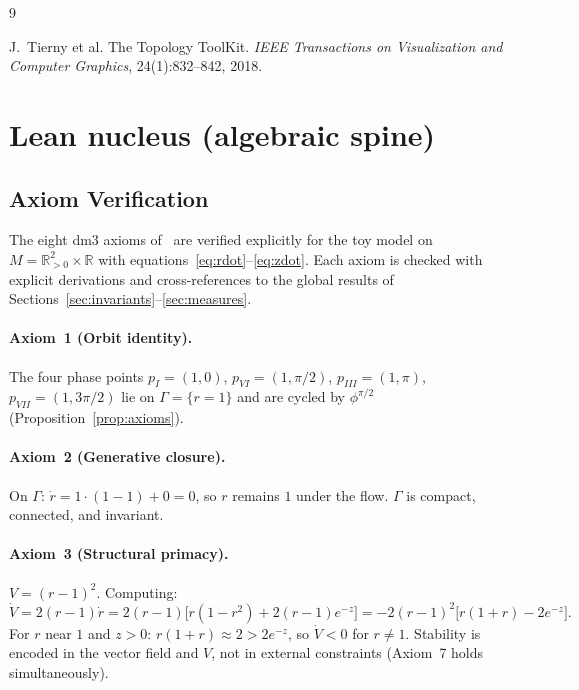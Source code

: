\documentclass[12pt, oneside]{book}
\theoremstyle{plain}
\theoremstyle{definition}
\theoremstyle{remark}
\newcommand{\Orb}{\Gamma}
\begin{document}
\begin{thebibliography}{9}

J.~Tierny et al.
\newblock The Topology ToolKit.
\newblock \emph{IEEE Transactions on Visualization and Computer Graphics}, 24(1):832--842, 2018.


\end{thebibliography}

\appendix
\section{Lean nucleus (algebraic spine)}

\subsection{Axiom Verification}\label{subsec:axioms}

The eight dm3 axioms of~\cite{Paper1} are verified explicitly for
the toy model on $M=\mathbb{R}^2_{>0}\times\mathbb{R}$ with
equations~\eqref{eq:rdot}--\eqref{eq:zdot}. Each axiom is checked
with explicit derivations and cross-references to the global results
of Sections~\ref{sec:invariants}--\ref{sec:measures}.

\paragraph{Axiom~1 (Orbit identity).}
The four phase points $p_I=(1,0)$, $p_{VI}=(1,\pi/2)$,
$p_{III}=(1,\pi)$, $p_{VII}=(1,3\pi/2)$ lie on $\Orb=\{r=1\}$
and are cycled by $\phi^{\pi/2}$ (Proposition~\ref{prop:axioms}).

\paragraph{Axiom~2 (Generative closure).}
On $\Orb$: $\dot r = 1\cdot(1-1) + 0 = 0$, so $r$ remains $1$
under the flow. $\Orb$ is compact, connected, and invariant.

\paragraph{Axiom~3 (Structural primacy).}
$V=(r-1)^2$. Computing:
\[
  \dot V = 2(r-1)\dot r
  = 2(r-1)\bigl[r(1-r^2) + 2(r-1)e^{-z}\bigr]
  = -2(r-1)^2\bigl[r(1+r) - 2e^{-z}\bigr].
\]
For $r$ near $1$ and $z>0$: $r(1+r)\approx 2 > 2e^{-z}$, so
$\dot V < 0$ for $r\ne 1$. Stability is encoded in the vector
field and $V$, not in external constraints (Axiom~7 holds
simultaneously).
\end{document}
